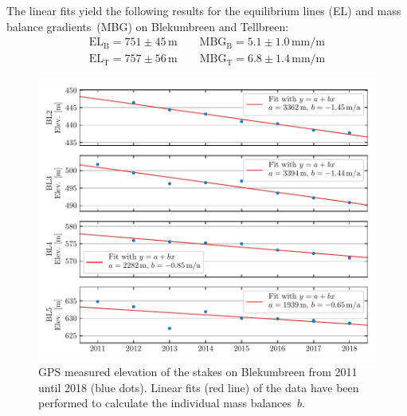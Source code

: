 The linear fits yield the following results for the equilibrium lines (EL) and mass balance gradients~(MBG) on Blekumbreen and Tellbreen:
\begin{equation*}
\begin{split}
\text{EL}_\text{B} = 751 \pm 45\, \text{m} \qquad \text{MBG}_\text{B} = 5.1 \pm 1.0\, \text{mm/m}\\
\text{EL}_\text{T} = 757 \pm 56\, \text{m} \qquad \text{MBG}_\text{T} = 6.8 \pm 1.4\, \text{mm/m}
\end{split}
\end{equation*}


\begin{figure}[H]
    \centering
    \includegraphics[width=\textwidth]{./figs/Elevation_Blekumbreen.pdf}
    \caption{GPS measured elevation of the stakes on Blekumbreen from 2011 until 2018 (blue dots).
    Linear fits (red line) of the data have been performed to calculate the individual mass balances~$b$.}
    \label{GPS:fig:elev_ble}
\end{figure}


